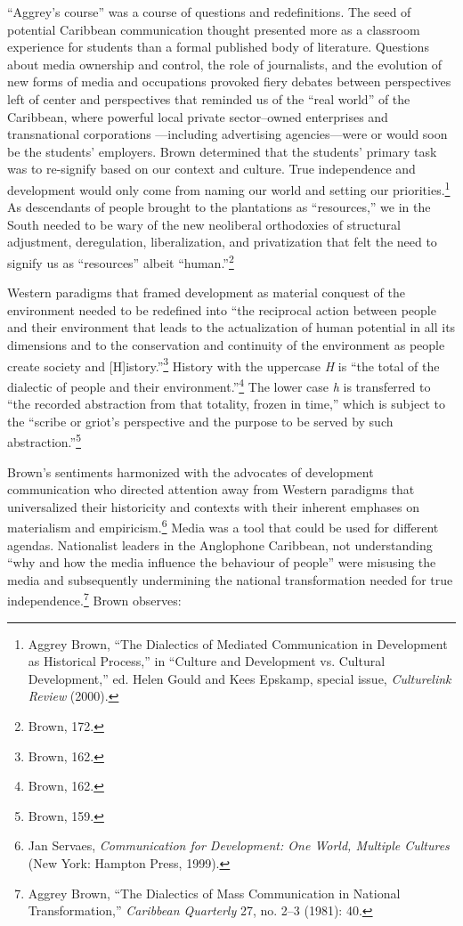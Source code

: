 \documentclass{tufte-handout}
\begin{document}
``Aggrey's course'' was a course of questions and redefinitions. The
seed of potential Caribbean communication thought presented more as a
classroom experience for students than a formal published body of
literature. Questions about media ownership and control, the role of
journalists, and the evolution of new forms of media and occupations
provoked fiery debates between perspectives left of center and
perspectives that reminded us of the ``real world'' of the Caribbean,
where powerful local private sector--owned enterprises and transnational
corporations ---including advertising agencies---were or would soon be
the students' employers. Brown determined that the students' primary
task was to re-signify based on our context and culture. True
independence and development would only come from naming our world and
setting our priorities.\footnote{Aggrey Brown, ``The Dialectics of
  Mediated Communication in Development as Historical Process,'' in
  ``Culture and Development vs. Cultural Development,'' ed. Helen Gould
  and Kees Epskamp, special issue, \emph{Culturelink Review} (2000).} As
descendants of people brought to the plantations as ``resources,'' we in
the South needed to be wary of the new neoliberal orthodoxies of
structural adjustment, deregulation, liberalization, and privatization
that felt the need to signify us as ``resources'' albeit
``human.''\footnote{Brown, 172.}

Western paradigms that framed development as material conquest of the
environment needed to be redefined into ``the reciprocal action between
people and their environment that leads to the actualization of human
potential in all its dimensions and to the conservation and continuity
of the environment as people create society and
{[}H{]}istory.''\footnote{Brown, 162.} History with the uppercase
\emph{H} is ``the total of the dialectic of people and their
environment.''\footnote{Brown, 162.} The lower case \emph{h} is
transferred to ``the recorded abstraction from that totality, frozen in
time,'' which is subject to the ``scribe or griot's perspective and the
purpose to be served by such abstraction.''\footnote{Brown, 159.}

Brown's sentiments harmonized with the advocates of development
communication who directed attention away from Western paradigms that
universalized their historicity and contexts with their inherent
emphases on materialism and empiricism.\footnote{Jan Servaes,
  \emph{Communication for Development: One World, Multiple Cultures}
  (New York: Hampton Press, 1999).} Media was a tool that could be used
for different agendas. Nationalist leaders in the Anglophone Caribbean,
not understanding ``why and how the media influence the behaviour of
people'' were misusing the media and subsequently undermining the
national transformation needed for true independence.\footnote{Aggrey
  Brown, ``The Dialectics of Mass Communication in National
  Transformation,'' \emph{Caribbean Quarterly} 27, no. 2--3 (1981): 40.}
Brown observes:
\end{document}
